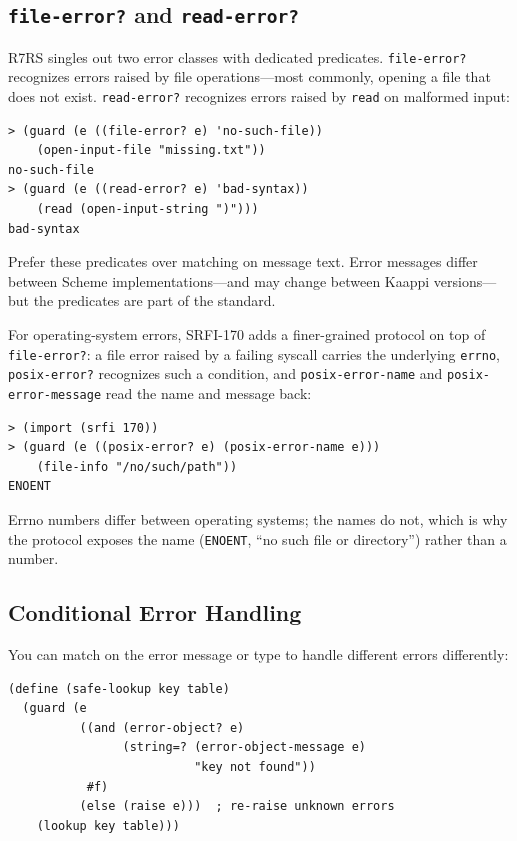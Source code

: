 \subsection{\texttt{file-error?} and \texttt{read-error?}}

R7RS singles out two error classes with dedicated predicates. \texttt{file-error?} recognizes errors raised by file operations---most commonly, opening a file that does not exist. \texttt{read-error?} recognizes errors raised by \texttt{read} on malformed input:

\begin{lstlisting}[style=repl]
> (guard (e ((file-error? e) 'no-such-file))
    (open-input-file "missing.txt"))
no-such-file
> (guard (e ((read-error? e) 'bad-syntax))
    (read (open-input-string ")")))
bad-syntax
\end{lstlisting}

Prefer these predicates over matching on message text. Error messages differ between Scheme implementations---and may change between Kaappi versions---but the predicates are part of the standard.

For operating-system errors, SRFI-170 adds a finer-grained protocol on top of \texttt{file-error?}: a file error raised by a failing syscall carries the underlying \texttt{errno}, \texttt{posix-error?} recognizes such a condition, and \texttt{posix-error-name} and \texttt{posix-error-message} read the name and message back:

\begin{lstlisting}[style=repl]
> (import (srfi 170))
> (guard (e ((posix-error? e) (posix-error-name e)))
    (file-info "/no/such/path"))
ENOENT
\end{lstlisting}

Errno numbers differ between operating systems; the names do not, which is why the protocol exposes the name (\texttt{ENOENT}, ``no such file or directory'') rather than a number.

\subsection{Conditional Error Handling}

You can match on the error message or type to handle different errors differently:

\begin{lstlisting}
(define (safe-lookup key table)
  (guard (e
          ((and (error-object? e)
                (string=? (error-object-message e)
                          "key not found"))
           #f)
          (else (raise e)))  ; re-raise unknown errors
    (lookup key table)))
\end{lstlisting}

